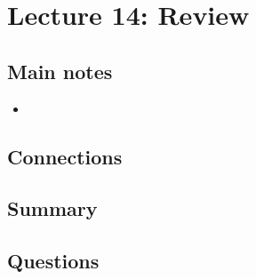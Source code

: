 \section{Lecture 14: Review}

\subsection{Main notes}


\begin{itemize}
	\item
\end{itemize}


\subsection{Connections}


\subsection{Summary}


\subsection{Questions}

